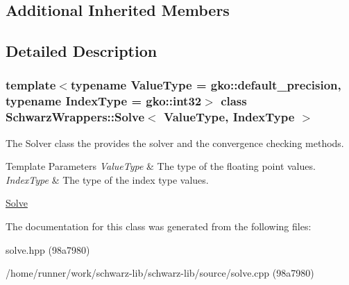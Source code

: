 \subsection*{Additional Inherited Members}


\subsection{Detailed Description}
\subsubsection*{template$<$typename Value\+Type = gko\+::default\+\_\+precision, typename Index\+Type = gko\+::int32$>$\newline
class Schwarz\+Wrappers\+::\+Solve$<$ Value\+Type, Index\+Type $>$}

The Solver class the provides the solver and the convergence checking methods. 


\begin{DoxyTemplParams}{Template Parameters}
{\em Value\+Type} & The type of the floating point values. \\
\hline
{\em Index\+Type} & The type of the index type values.\\
\hline
\end{DoxyTemplParams}
\hyperlink{group__solve}{Solve} 

The documentation for this class was generated from the following files\+:\begin{DoxyCompactItemize}
\item 
solve.\+hpp (98a7980)\item 
/home/runner/work/schwarz-\/lib/schwarz-\/lib/source/solve.\+cpp (98a7980)\end{DoxyCompactItemize}
